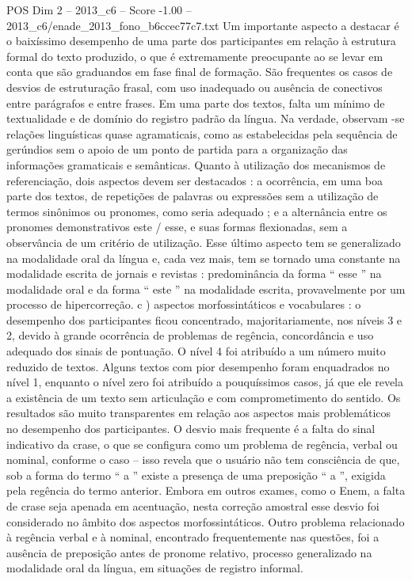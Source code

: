 \begin{textsample}{POS Dim 2 – 2013\_c6 – Score -1.00 – 2013\_c6/enade\_2013\_fono\_b6ccec77c7.txt}
Um importante aspecto a destacar é o baixíssimo desempenho de uma parte dos participantes em relação à estrutura formal do texto produzido, o que é extremamente preocupante ao se levar em conta que são graduandos em fase final de formação.
São frequentes os casos de desvios de estruturação frasal, com uso inadequado ou ausência de conectivos entre parágrafos e entre frases.
Em uma parte dos textos, falta um mínimo de textualidade e de domínio do registro padrão da língua.
Na verdade, observam -se relações linguísticas quase agramaticais, como as estabelecidas pela sequência de gerúndios sem o apoio de um ponto de partida para a organização das informações gramaticais e semânticas.
Quanto à utilização dos mecanismos de referenciação, dois aspectos devem ser destacados : a ocorrência, em uma boa parte dos textos, de repetições de palavras ou expressões sem a utilização de termos sinônimos ou pronomes, como seria adequado ; e a alternância entre os pronomes demonstrativos este / esse, e suas formas flexionadas, sem a observância de um critério de utilização.
Esse último aspecto tem se generalizado na modalidade oral da língua e, cada vez mais, tem se tornado uma constante na modalidade escrita de jornais e revistas : predominância da forma “ esse ” na modalidade oral e da forma “ este ” na modalidade escrita, provavelmente por um processo de hipercorreção. c ) aspectos morfossintáticos e vocabulares : o desempenho dos participantes ficou concentrado, majoritariamente, nos níveis 3 e 2, devido à grande ocorrência de problemas de regência, concordância e uso adequado dos sinais de pontuação.
O nível 4 foi atribuído a um número muito reduzido de textos.
Alguns textos com pior desempenho foram enquadrados no nível 1, enquanto o nível zero foi atribuído a pouquíssimos casos, já que ele revela a existência de um texto sem articulação e com comprometimento do sentido.
Os resultados são muito transparentes em relação aos aspectos mais problemáticos no desempenho dos participantes.
O desvio mais frequente é a falta do sinal indicativo da crase, o que se configura como um problema de regência, verbal ou nominal, conforme o caso – isso revela que o usuário não tem consciência de que, sob a forma do termo “ a ” existe a presença de uma preposição “ a ”, exigida pela regência do termo anterior.
Embora em outros exames, como o Enem, a falta de crase seja apenada em acentuação, nesta correção amostral esse desvio foi considerado no âmbito dos aspectos morfossintáticos.
Outro problema relacionado à regência verbal e à nominal, encontrado frequentemente nas questões, foi a ausência de preposição antes de pronome relativo, processo generalizado na modalidade oral da língua, em situações de registro informal.

\end{textsample}

